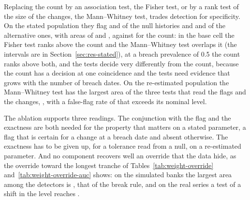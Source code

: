 Replacing the count by an association test, the Fisher test, or by a rank test of the size of the changes, the Mann--Whitney test, trades detection for specificity. On the stated population they flag \statedNullFisher{} and \statedNullMw{} of the null histories and \statedAltFisher{} and \statedAltMw{} of the alternative ones, with areas of \statedAucFisher{} and \statedAucMw{}, against \statedAucEngine{} for the count: in the base cell the Fisher test ranks above the count and the Mann--Whitney test overlaps it (the intervals are in Section~\ref{sec:res-stated}), at a breach prevalence of 0.5 the count ranks above both, and the tests decide very differently from the count, because the count has a decision at one coincidence and the tests need evidence that grows with the number of breach dates. On the re-estimated population the Mann--Whitney test has the largest area of the three tests that read the flags and the changes, \fitAucCMw{}, with a false-flag rate of \fitNullMw{} that exceeds its nominal level.

The ablation supports three readings. The conjunction with the flag and the exactness are both needed for the property that matters on a stated parameter, a flag that is certain for a change at a breach date and absent otherwise. The exactness has to be given up, for a tolerance read from a null, on a re-estimated parameter. And no component recovers well an override that the data hide, as the override toward the longest tranche of Tables~\ref{tab:weight-override} and~\ref{tab:weight-override-auc} shows: on the simulated banks the largest area among the detectors is \wTopAuc{}, that of the break rule, and on the real series a test of a shift in the level reaches \wRealTopAuc{}.
